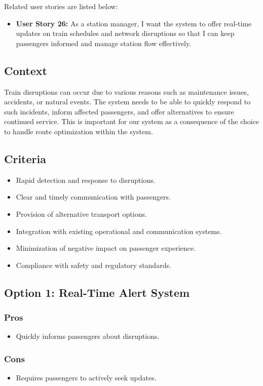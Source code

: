 Related user stories are listed below:
\begin{itemize}
    \item \textbf{User Story 26:} As a station manager, I want the system to offer real-time updates on train schedules and network disruptions so that I can keep passengers informed and manage station flow effectively.
\end{itemize}

\subsection*{Context}
Train disruptions can occur due to various reasons such as maintenance issues, accidents, or natural events. The system needs to be able to quickly respond to such incidents, inform affected passengers, and offer alternatives to ensure continued service.
This is important for our system as a consequence of the choice to handle route optimization within the system.

\subsection*{Criteria}
\begin{itemize}
    \item Rapid detection and response to disruptions.
    \item Clear and timely communication with passengers.
    \item Provision of alternative transport options.
    \item Integration with existing operational and communication systems.
    \item Minimization of negative impact on passenger experience.
    \item Compliance with safety and regulatory standards.
\end{itemize}


\subsection*{Option 1: Real-Time Alert System}
\subsubsection*{Pros}
\begin{itemize}
    \item Quickly informs passengers about disruptions.
\end{itemize}
\subsubsection*{Cons}
\begin{itemize}
    \item Requires passengers to actively seek updates.
\end{itemize}

